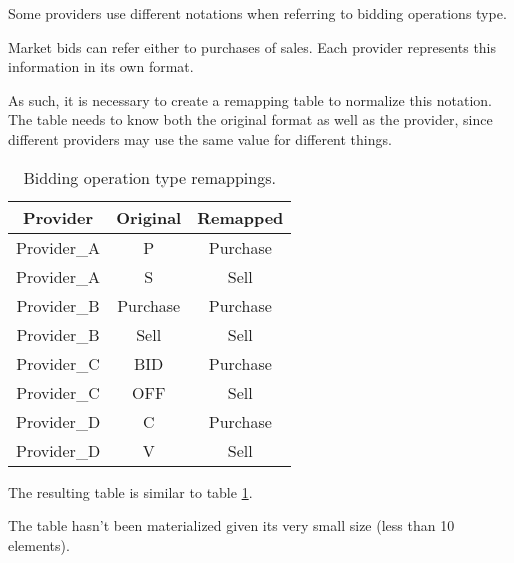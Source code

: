 Some providers use different notations when referring to bidding operations type.

Market bids can refer either to purchases of sales.
Each provider represents this information in its own format.

As such, it is necessary to create a remapping table to normalize this notation.
The table needs to know both the original format as well as the provider, since different providers may use the same value for different things.

\begin{table}
    \centering
    \begin{tabular}{|c|c|c|}
        \toprule
        Provider    & Original  & Remapped  \\
        \midrule
        Provider\_A & P         & Purchase  \\
        Provider\_A & S         & Sell      \\
        Provider\_B & Purchase  & Purchase  \\
        Provider\_B & Sell      & Sell      \\
        Provider\_C & BID       & Purchase  \\
        Provider\_C & OFF       & Sell      \\
        Provider\_D & C         & Purchase  \\
        Provider\_D & V         & Sell      \\
        \bottomrule
    \end{tabular}
    \caption{Bidding operation type remappings.}
    \label{tab:dwh:remapping:op_type}
\end{table}

The resulting table is similar to table \ref{tab:dwh:remapping:op_type}.

The table hasn't been materialized given its very small size (less than 10 elements).
